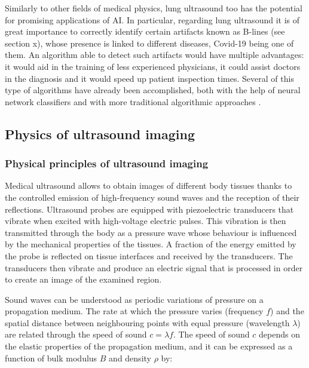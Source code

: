 \documentclass[11pt]{article} %
\begin{document}
	Similarly to other fields of medical physics, lung ultrasound too has the potential for promising applications of AI. In particular, regarding lung ultrasound it is of great importance to correctly identify certain artifacts known as B-lines (see section x), whose presence is linked to different diseases, Covid-19 being one of them. An algorithm able to detect such artifacts would have multiple advantages: it would aid in the training of less experienced physicians, it could assist doctors in the diagnosis and it would speed up patient inspection times. Several of this type of algorithms have already been accomplished, both with the help of neural network classifiers \cite{vanSloun}\cite{born2020pocovid}\cite{cristiana2020automated}\cite{roy2020deep} and with more traditional algorithmic approaches \cite{brattain}\cite{moshavegh}.
	
	
\subsection{Physics of ultrasound imaging}
\subsubsection{Physical principles of ultrasound imaging}


	Medical ultrasound allows to obtain images of different body tissues thanks to the controlled emission of high-frequency sound waves and the reception of their reflections. Ultrasound probes are equipped with piezoelectric transducers that vibrate when excited with high-voltage electric pulses. This vibration is then transmitted through the body as a pressure wave whose behaviour is influenced by the mechanical properties of the tissues. A fraction of the energy emitted by the probe is reflected on tissue interfaces and received by the transducers. The transducers then vibrate and produce an electric signal that is processed in order to create an image of the examined region. 
	
	
	Sound waves can be understood as periodic variations of pressure on a propagation medium. The rate at which the pressure varies (frequency $f$) and the spatial distance between neighbouring points with equal pressure (wavelength $\lambda$) are related through the speed of sound $c = \lambda f$. The speed of sound $c$ depends on the elastic properties of the propagation medium, and it can be expressed as a function of bulk modulus $B$ and density $\rho$ by:
	
\end{document}
